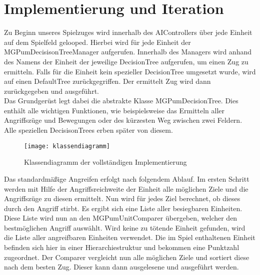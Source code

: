 

\chapter{Implementierung und Iteration}

Zu Beginn unseres Spielzuges wird innerhalb des AIControllers über jede Einheit auf dem Spielfeld gelooped. Hierbei wird für jede Einheit der MGPumDecisisonTreeManager aufgerufen. Innerhalb des Managers wird anhand des Namens der Einheit der jeweilige DecisionTree aufgerufen, um einen Zug zu ermitteln. Falls für die Einheit kein spezieller DecisionTree umgesetzt wurde, wird auf einen DefaultTree zurückgegriffen. Der ermittelt Zug wird dann zurückgegeben und ausgeführt.\\
Das Grundgerüst legt dabei die abstrakte Klasse MGPumDecisionTree. Dies enthält alle wichtigen Funktionen, wie beispielsweise das Ermitteln aller Angriffszüge und Bewegungen oder des kürzesten Weg zwischen zwei Feldern. Alle speziellen DecisisonTrees erben später von diesem. 

\begin{figure}[H]
	\centering
	\texttt{[image: klassendiagramm]}
	\caption{Klassendiagramm der vollständigen Implementierung}
	\label{fig:klassendiagramm}
\end{figure}

Das standardmäßige Angreifen erfolgt nach folgendem Ablauf. Im ersten Schritt werden mit Hilfe der Angriffsreichweite der Einheit alle möglichen Ziele und die Angriffszüge zu diesen ermittelt. Nun wird für jedes Ziel berechnet, ob dieses durch den Angriff stirbt. Es ergibt sich eine Liste aller besiegbaren Einheiten. Diese Liste wird nun an den MGPumUnitComparer übergeben, welcher den bestmöglichen Angriff auswählt. Wird keine zu tötende Einheit gefunden, wird die Liste aller angreifbaren Einheiten verwendet. Die im Spiel enthaltenen Einheit befinden sich hier in einer Hierarchiestruktur und bekommen eine Punktzahl zugeordnet. Der Comparer vergleicht nun alle möglichen Ziele und sortiert diese nach dem besten Zug. Dieser kann dann ausgelesene und ausgeführt werden.

